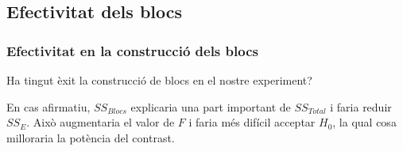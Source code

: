 \documentclass[12pt,t]{beamer}
\theoremstyle{plain}
\theoremstyle{definition}
\begin{document}
%
%
%
%
%
%
%
%

\subsection{Efectivitat dels blocs}
\begin{frame}
\frametitle{Efectivitat en la construcció dels blocs}

Ha tingut èxit la construcció de blocs en el nostre experiment?
\medskip

En cas afirmatiu,   $SS_{Blocs}$ explicaria una part important de $SS_{Total}$ i faria reduir $SS_E$.
Això augmentaria el valor de $F$ i faria més difícil acceptar $H_0$, la qual cosa milloraria la potència del contrast.
\end{frame}
\end{document}
